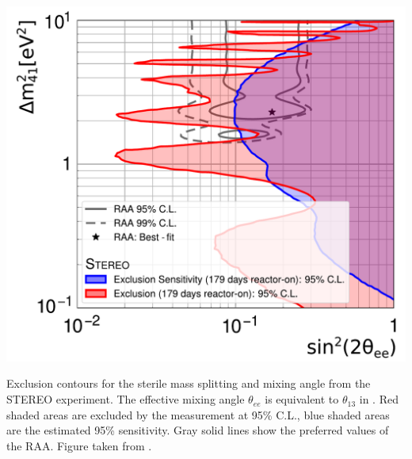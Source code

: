 \begin{marginfigure}
    \centering
    \includegraphics{figures/theory/ST_osc.pdf}
    \caption{Exclusion contours for the sterile mass splitting and mixing angle from the \textsc{STEREO} experiment. The effective mixing angle $\theta_{ee}$ is equivalent to $\theta_{13}$ in . Red shaded areas are excluded by the measurement at 95\% C.L., blue shaded areas are the estimated 95\% sensitivity. Gray solid lines show the preferred values of the RAA. Figure taken from \cite{Licciardi:2021hyi}.\label{fig:sterile-exclusions-stereo}}
\end{marginfigure}
